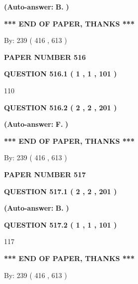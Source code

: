\documentclass[12pt]{article}
\begin{document}
 
{\textbf{(Auto-answer:}}
{\textbf{\large{
B.}}}
{\textbf{)}}
 
 
   
   
   
   
\vspace{1.0in} 
{\textbf{\large{ *** END OF PAPER, THANKS *** }}} 
   
   
\hspace{1.0in} By: 
 239 ( 416 ,  613 )
   
   
   
   
\newpage 
\setcounter{page}{ 
   516001 } 
   
   
 {\textbf{ \Large{ PAPER NUMBER  516  }}}
   
   
   
   
  
  
{\textbf{\large{QUESTION
516.1 
 ( 1 , 1 , 101 )
}}}

110
  
  
{\textbf{\large{QUESTION
516.2 
 ( 2 , 2 , 201 )
}}}
 
 
{\textbf{(Auto-answer:}}
{\textbf{\large{
F.}}}
{\textbf{)}}
 
 
   
   
   
   
\vspace{1.0in} 
{\textbf{\large{ *** END OF PAPER, THANKS *** }}} 
   
   
\hspace{1.0in} By: 
 239 ( 416 ,  613 )
   
   
   
   
\newpage 
\setcounter{page}{ 
   517001 } 
   
   
 {\textbf{ \Large{ PAPER NUMBER  517  }}}
   
   
   
   
  
  
{\textbf{\large{QUESTION
517.1 
 ( 2 , 2 , 201 )
}}}
 
 
{\textbf{(Auto-answer:}}
{\textbf{\large{
B.}}}
{\textbf{)}}
 
 
  
  
{\textbf{\large{QUESTION
517.2 
 ( 1 , 1 , 101 )
}}}

117
   
   
   
   
\vspace{1.0in} 
{\textbf{\large{ *** END OF PAPER, THANKS *** }}} 
   
   
\hspace{1.0in} By: 
 239 ( 416 ,  613 )
   
   
   
\end{document}
